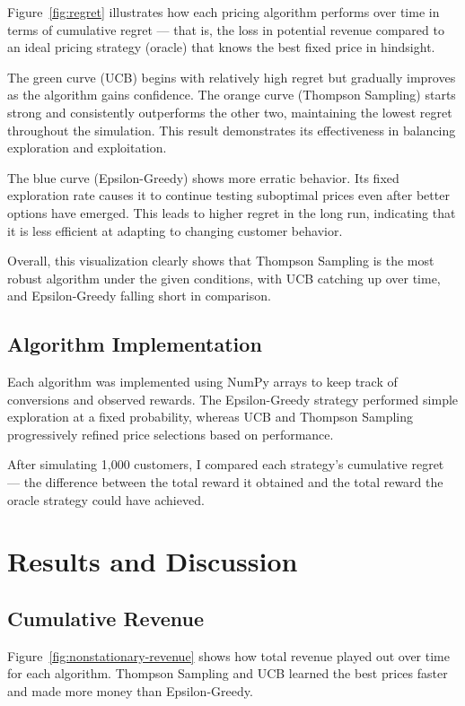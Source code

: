 \documentclass[12pt]{article}
\begin{document}
Figure~\ref{fig:regret} illustrates how each pricing algorithm performs over time in terms of cumulative regret — that is, the loss in potential revenue compared to an ideal pricing strategy (oracle) that knows the best fixed price in hindsight.

The green curve (UCB) begins with relatively high regret but gradually improves as the algorithm gains confidence. The orange curve (Thompson Sampling) starts strong and consistently outperforms the other two, maintaining the lowest regret throughout the simulation. This result demonstrates its effectiveness in balancing exploration and exploitation.

The blue curve (Epsilon-Greedy) shows more erratic behavior. Its fixed exploration rate causes it to continue testing suboptimal prices even after better options have emerged. This leads to higher regret in the long run, indicating that it is less efficient at adapting to changing customer behavior. 

Overall, this visualization clearly shows that Thompson Sampling is the most robust algorithm under the given conditions, with UCB catching up over time, and Epsilon-Greedy falling short in comparison.
\newpage

\subsection{Algorithm Implementation}

Each algorithm was implemented using NumPy arrays to keep track of conversions and observed rewards. The Epsilon-Greedy strategy performed simple exploration at a fixed probability, whereas UCB and Thompson Sampling progressively refined price selections based on performance.

After simulating 1,000 customers, I compared each strategy's cumulative regret — the difference between the total reward it obtained and the total reward the oracle strategy could have achieved.

\section{Results and Discussion}

\subsection*{Cumulative Revenue}
Figure~\ref{fig:nonstationary-revenue} shows how total revenue played out over time for each algorithm. Thompson Sampling and UCB learned the best prices faster and made more money than Epsilon-Greedy.
\end{document}
